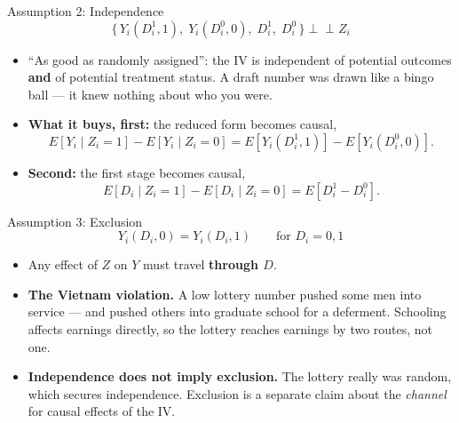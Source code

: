 \documentclass[
  11pt,
  ignorenonframetext,
  aspectratio=169,
]{beamer}
\providecommand{\tightlist}{%
  \setlength{\itemsep}{0pt}\setlength{\parskip}{0pt}}
\newcommand{\indep}{\perp\!\!\!\perp}
\begin{document}
\begin{frame}{Assumption 2: Independence}
\protect{}\label{assumption-2-independence}
\[\{\,Y_i(D^1_i,1),\; Y_i(D^0_i,0),\; D^1_i,\; D^0_i\,\} \indep Z_i\]

\begin{itemize}
\tightlist
\item
  ``As good as randomly assigned'': the IV is independent of potential
  outcomes \textbf{and} of potential treatment status. A draft number
  was drawn like a bingo ball --- it knew nothing about who you were.
\item
  \textbf{What it buys, first:} the reduced form becomes causal,
  \[E[Y_i \mid Z_i = 1] - E[Y_i \mid Z_i = 0] = E[Y_i(D^1_i,1)] - E[Y_i(D^0_i,0)].\]
\item
  \textbf{Second:} the first stage becomes causal,
  \[E[D_i \mid Z_i = 1] - E[D_i \mid Z_i = 0] = E[D^1_i - D^0_i].\]
\end{itemize}
\end{frame}

\begin{frame}{Assumption 3: Exclusion}
\protect{}\label{assumption-3-exclusion}
\[Y_i(D_i, 0) = Y_i(D_i, 1) \qquad \text{for } D_i = 0, 1\]

\begin{itemize}
\tightlist
\item
  Any effect of \(Z\) on \(Y\) must travel \textbf{through \(D\)}.
\item
  \textbf{The Vietnam violation.} A low lottery number pushed some men
  into service --- and pushed others into graduate school for a
  deferment. Schooling affects earnings directly, so the lottery reaches
  earnings by two routes, not one.
\item
  \textbf{Independence does not imply exclusion.} The lottery really was
  random, which secures independence. Exclusion is a separate claim
  about the \emph{channel} for causal effects of the IV.
\end{itemize}
\end{frame}
\end{document}
